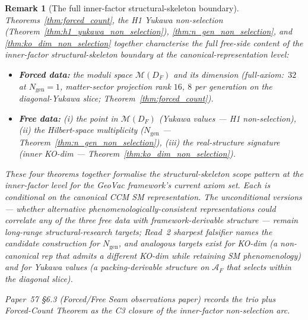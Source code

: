 \documentclass[11pt]{article}
\newtheorem{remark}{Remark}
\begin{document}
\begin{remark}[The full inner-factor structural-skeleton boundary]
\label{rem:full_inner_factor_boundary}
Theorems~\ref{thm:forced_count}, the H1 Yukawa non-selection
(Theorem~\ref{thm:h1_yukawa_non_selection}), \ref{thm:n_gen_non_selection}, and
\ref{thm:ko_dim_non_selection} together characterise the full
free-side content of the inner-factor structural-skeleton boundary
at the canonical-representation level:
\begin{itemize}\setlength{\itemsep}{2pt}
\item \textbf{Forced data:}  the moduli space $\mathcal{M}(D_F)$ and
  its dimension (full-axiom:\ $32$ at $N_{\mathrm{gen}} = 1$, matter-sector
  projection rank $16$, $8$ per generation on the diagonal-Yukawa slice;
  Theorem~\ref{thm:forced_count}).
\item \textbf{Free data:}  (i) the point in $\mathcal{M}(D_F)$
  (Yukawa values --- H1 non-selection),
  (ii) the Hilbert-space multiplicity ($N_{\mathrm{gen}}$ ---
  Theorem~\ref{thm:n_gen_non_selection}),
  (iii) the real-structure signature (inner KO-dim ---
  Theorem~\ref{thm:ko_dim_non_selection}).
\end{itemize}

These four theorems together formalise the structural-skeleton scope
pattern at the inner-factor level for the GeoVac framework's current
axiom set.  Each is conditional on the canonical CCM SM
representation.  The unconditional versions --- whether alternative
phenomenologically-consistent representations could correlate any of
the three free data with framework-derivable structure --- remain
long-range structural-research targets;  Read~2 sharpest falsifier
names the candidate construction for $N_{\mathrm{gen}}$, and
analogous targets exist for KO-dim (a non-canonical rep that admits
a different KO-dim while retaining SM phenomenology) and for Yukawa
values (a packing-derivable structure on $\mathcal{A}_F$ that selects
within the diagonal slice).

Paper~57 \S 6.3 (Forced/Free Seam observations paper) records the
trio plus Forced-Count Theorem as the C3 closure of the inner-factor
non-selection arc.
\end{remark}

\end{document}
